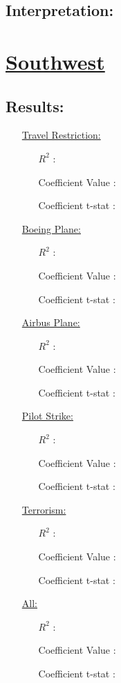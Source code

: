 \documentclass[12pt]{report}
\begin{document}
\subsection*{Interpretation:}

\newpage
\section*{\underline{Southwest}}
\subsection*{Results:}
\begin{enumerate}
    \item[\underline{Travel Restriction:}]
        \begin{enumerate}
            \item[$R^2$]:
            \item[Coefficient Value]:
            \item[Coefficient t-stat]:
        \end{enumerate}
    \item[\underline{Boeing Plane:}]
        \begin{enumerate}
            \item[$R^2$]:
            \item[Coefficient Value]:
            \item[Coefficient t-stat]:
        \end{enumerate}
    \item[\underline{Airbus Plane:}]
        \begin{enumerate}
            \item[$R^2$]:
            \item[Coefficient Value]:
            \item[Coefficient t-stat]:
        \end{enumerate}
    \item[\underline{Pilot Strike:}]
        \begin{enumerate}
            \item[$R^2$]:
            \item[Coefficient Value]:
            \item[Coefficient t-stat]:
        \end{enumerate}
    \item[\underline{Terrorism:}]
        \begin{enumerate}
            \item[$R^2$]:
            \item[Coefficient Value]:
            \item[Coefficient t-stat]:
        \end{enumerate}
    \item[\underline{All:}]
        \begin{enumerate}
            \item[$R^2$]:
            \item[Coefficient Value]:
            \item[Coefficient t-stat]:
        \end{enumerate}
\end{enumerate}
\end{document}
